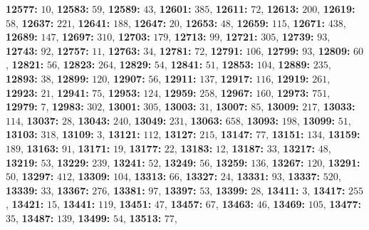 \textsf{\bfseries 12577:} $10$, \textsf{\bfseries 12583:} $59$, \textsf{\bfseries 12589:} $43$, \textsf{\bfseries 12601:} $385$, \textsf{\bfseries 12611:} $72$, \textsf{\bfseries 12613:} $200$, \textsf{\bfseries 12619:} $58$, \textsf{\bfseries 12637:} $221$, \textsf{\bfseries 12641:} $188$, \textsf{\bfseries 12647:} $20$, \textsf{\bfseries 12653:} $48$, \textsf{\bfseries 12659:} $115$, \textsf{\bfseries 12671:} $438$, \textsf{\bfseries 12689:} $147$, \textsf{\bfseries 12697:} $310$, \textsf{\bfseries 12703:} $179$, \textsf{\bfseries 12713:} $99$, \textsf{\bfseries 12721:} $305$, \textsf{\bfseries 12739:} $93$, \textsf{\bfseries 12743:} $92$, \textsf{\bfseries 12757:} $11$, \textsf{\bfseries 12763:} $34$, \textsf{\bfseries 12781:} $72$, \textsf{\bfseries 12791:} $106$, \textsf{\bfseries 12799:} $93$, \textsf{\bfseries 12809:} $60$, \textsf{\bfseries 12821:} $56$, \textsf{\bfseries 12823:} $264$, \textsf{\bfseries 12829:} $54$, \textsf{\bfseries 12841:} $51$, \textsf{\bfseries 12853:} $104$, \textsf{\bfseries 12889:} $235$, \textsf{\bfseries 12893:} $38$, \textsf{\bfseries 12899:} $120$, \textsf{\bfseries 12907:} $56$, \textsf{\bfseries 12911:} $137$, \textsf{\bfseries 12917:} $116$, \textsf{\bfseries 12919:} $261$, \textsf{\bfseries 12923:} $21$, \textsf{\bfseries 12941:} $75$, \textsf{\bfseries 12953:} $124$, \textsf{\bfseries 12959:} $258$, \textsf{\bfseries 12967:} $160$, \textsf{\bfseries 12973:} $751$, \textsf{\bfseries 12979:} $7$, \textsf{\bfseries 12983:} $302$, \textsf{\bfseries 13001:} $305$, \textsf{\bfseries 13003:} $31$, \textsf{\bfseries 13007:} $85$, \textsf{\bfseries 13009:} $217$, \textsf{\bfseries 13033:} $114$, \textsf{\bfseries 13037:} $28$, \textsf{\bfseries 13043:} $240$, \textsf{\bfseries 13049:} $231$, \textsf{\bfseries 13063:} $658$, \textsf{\bfseries 13093:} $198$, \textsf{\bfseries 13099:} $51$, \textsf{\bfseries 13103:} $318$, \textsf{\bfseries 13109:} $3$, \textsf{\bfseries 13121:} $112$, \textsf{\bfseries 13127:} $215$, \textsf{\bfseries 13147:} $77$, \textsf{\bfseries 13151:} $134$, \textsf{\bfseries 13159:} $189$, \textsf{\bfseries 13163:} $91$, \textsf{\bfseries 13171:} $19$, \textsf{\bfseries 13177:} $22$, \textsf{\bfseries 13183:} $12$, \textsf{\bfseries 13187:} $33$, \textsf{\bfseries 13217:} $48$, \textsf{\bfseries 13219:} $53$, \textsf{\bfseries 13229:} $239$, \textsf{\bfseries 13241:} $52$, \textsf{\bfseries 13249:} $56$, \textsf{\bfseries 13259:} $136$, \textsf{\bfseries 13267:} $120$, \textsf{\bfseries 13291:} $50$, \textsf{\bfseries 13297:} $412$, \textsf{\bfseries 13309:} $104$, \textsf{\bfseries 13313:} $66$, \textsf{\bfseries 13327:} $24$, \textsf{\bfseries 13331:} $93$, \textsf{\bfseries 13337:} $520$, \textsf{\bfseries 13339:} $33$, \textsf{\bfseries 13367:} $276$, \textsf{\bfseries 13381:} $97$, \textsf{\bfseries 13397:} $53$, \textsf{\bfseries 13399:} $28$, \textsf{\bfseries 13411:} $3$, \textsf{\bfseries 13417:} $255$, \textsf{\bfseries 13421:} $15$, \textsf{\bfseries 13441:} $119$, \textsf{\bfseries 13451:} $47$, \textsf{\bfseries 13457:} $67$, \textsf{\bfseries 13463:} $46$, \textsf{\bfseries 13469:} $105$, \textsf{\bfseries 13477:} $35$, \textsf{\bfseries 13487:} $139$, \textsf{\bfseries 13499:} $54$, \textsf{\bfseries 13513:} $77$, 
